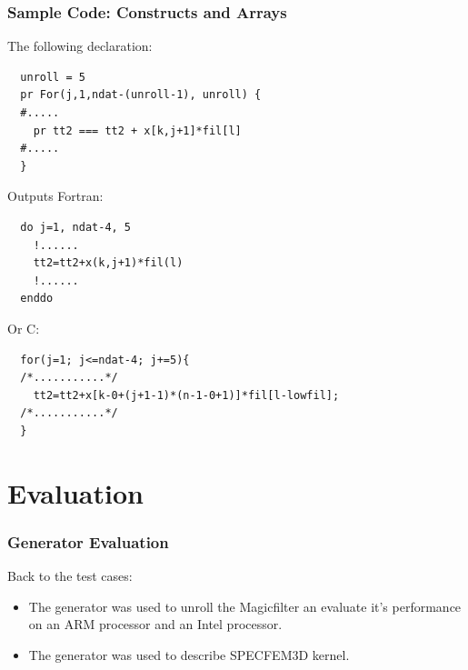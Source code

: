 \documentclass{beamer}
\begin{document}
\begin{frame}[fragile]
\frametitle{Sample Code: Constructs and Arrays}
The following declaration:
\tiny
{}
\begin{lstlisting}
  unroll = 5
  pr For(j,1,ndat-(unroll-1), unroll) {
  #.....
    pr tt2 === tt2 + x[k,j+1]*fil[l]
  #.....
  }
\end{lstlisting}
\normalsize 
Outputs Fortran:
\tiny
{}
\begin{lstlisting}
  do j=1, ndat-4, 5
    !......
    tt2=tt2+x(k,j+1)*fil(l)
    !......
  enddo
\end{lstlisting}
\normalsize
Or C:
\tiny
{}
\begin{lstlisting}
  for(j=1; j<=ndat-4; j+=5){
  /*...........*/
    tt2=tt2+x[k-0+(j+1-1)*(n-1-0+1)]*fil[l-lowfil];
  /*...........*/
  }
\end{lstlisting}
\end{frame}

\section{Evaluation}
\begin{frame}
\frametitle{Generator Evaluation}
Back to the test cases:
\begin{itemize}
\item The generator was used to unroll the Magicfilter an evaluate it's performance on an ARM processor and an Intel processor.
\item The generator was used to describe SPECFEM3D kernel.
\end{itemize}

\end{frame}
\end{document}
